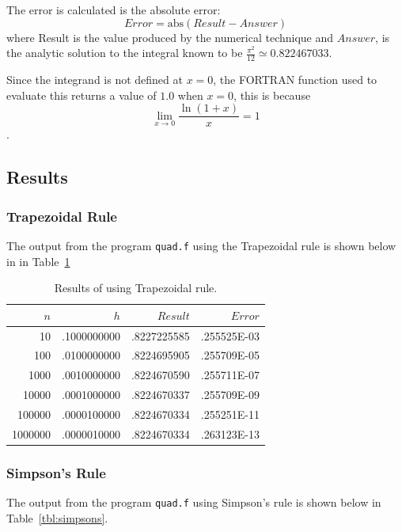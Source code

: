 \documentclass[a4paper]{IEEEtran}
\begin{document}
    The error is calculated is the absolute error:
        \[ Error = \mathrm{abs}(Result - Answer) \]
    where Result is the value produced by the numerical technique and
    $Answer$, is the analytic solution to the integral known to
    be $\frac{\pi^{2}}{12} \simeq 0.822467033$.

    Since the integrand is not defined at $x=0$, the FORTRAN function
    used to evaluate this returns a value of $1.0$ when $x=0$, this is
    because
        \[ \lim_{x \rightarrow 0} \frac{\ln(1+x)}{x} = 1 \].


\subsection{Results}

    \subsubsection{Trapezoidal Rule}
    The output from the program \verb+quad.f+ using the Trapezoidal
    rule is shown below in in Table~\ref{tbl:trapezoidal} 

    \begin{table}[h] 
      \caption{Results of using Trapezoidal rule.} 
      \label{tbl:trapezoidal} 
      \begin{center}
      \begin{tabular}{|r|r|r|r|} \hline
           $n$  &         $h$   &     $Result$ &   $Error$ \\ 
       \hline
       \hline
            10  & .1000000000   &.8227225585   &.255525E-03 \\
           100  & .0100000000   &.8224695905   &.255709E-05 \\
          1000  & .0010000000   &.8224670590   &.255711E-07 \\
         10000  & .0001000000   &.8224670337   &.255709E-09 \\
        100000  & .0000100000   &.8224670334   &.255251E-11 \\
       1000000  & .0000010000   &.8224670334   &.263123E-13 \\ \hline
       \end{tabular}
       \end{center} 
    \end{table} 

    \subsubsection{Simpson's Rule}
    The output from the program \verb+quad.f+ using Simpson's rule is
    shown below in Table~\ref{tbl:simpsons}.
\end{document}
